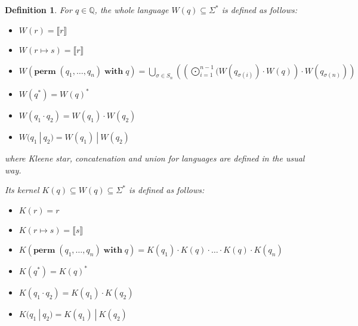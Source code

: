 \documentclass[a4paper,11pt] {article}
\theoremstyle{plain}
\newtheorem{definition}[theorem]{Definition}
\newcommand{\perm}{ \textbf{perm}\; }
\newcommand{\with}{ \;\textbf{with}\; }
\begin{document}
\begin{definition}
  For $q \in \mathbb{Q}$, the whole language $W(q) \subseteq \Sigma^*$
  is defined as follows:
  \begin{itemize}
  \item $W(r) = \llbracket r \rrbracket$
  \item $W(r \mapsto s) = \llbracket r \rrbracket$
  \item $W(\perm(q_1, \ldots, q_n) \with q) =
    \bigcup_{\sigma \in S_n} \left( \left(\bigodot_{i=1}^{n-1} (W(q_{\sigma(i)})
    \cdot W(q) \right)
    \cdot W(q_{\sigma(n)}) \right)$
  \item $W(q^*) = {W(q)}^*$
  \item $W(q_1 \cdot q_2) = W(q_1) \cdot W(q_2)$
  \item $W(q_1 ~|~ q_2) = W(q_1) ~|~ W(q_2)$
  \end{itemize}
  where Kleene star, concatenation and union for languages are defined
  in the usual way.
  
  Its kernel $K(q) \subseteq W(q) \subseteq \Sigma^*$ is defined as follows:
  \begin{itemize}
  \item $K(r) = r$
  \item $K(r \mapsto s) = \llbracket s \rrbracket$
  \item $K(\perm (q_1, \ldots, q_n) \with q) =
    K(q_1) \cdot K(q) \cdot \ldots \cdot
    K(q) \cdot K(q_n)$  
  \item $K(q^*) = {K(q)}^*$
  \item $K(q_1 \cdot q_2) = K(q_1) \cdot K(q_2)$
  \item $K(q_1 ~|~ q_2) = K(q_1) ~|~ K(q_2)$
  \end{itemize}
\end{definition}
\end{document}

